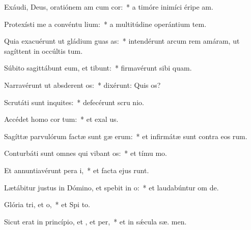 \item Exáudi, Deus, oratiónem am cum cor:~* a timóre inimíci éripe  am.
\item Protexísti me a convéntu lium:~* a multitúdine operántium tem.
\item Quia exacuérunt ut gládium guas as:~* intendérunt arcum rem amáram, ut sagíttent in occúltis tum.
\item Súbito sagittábunt eum, et  tibunt:~* firmavérunt sibi  quam.
\item Narravérunt ut absderent os:~* dixérunt: Quis  os?
\item Scrutáti sunt inquites:~* defecérunt scru nio.
\item Accédet homo  cor tum:~* et exal us.
\item Sagíttæ parvulórum factæ sunt gæ erum:~* et infirmátæ sunt contra eos  rum.
\item Conturbáti sunt omnes qui vibant os:~* et tímu  mo.
\item Et annuntiavérunt pera i,~* et facta ejus runt.
\item Lætábitur justus in Dómino, et spebit in o:~* et laudabúntur om  de.
\item Glória tri, et o,~* et Spi to.
\item Sicut erat in princípio, et , et per,~* et in sǽcula sæ. men.
